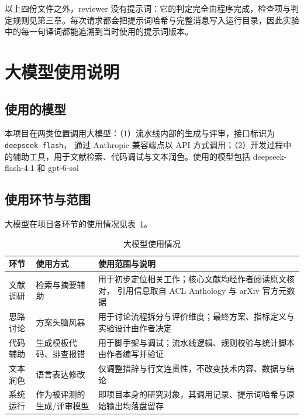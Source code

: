 \documentclass[12pt, a4paper]{ctexart}
\numberwithin{table}{section}
\numberwithin{figure}{section}
\begin{document}
以上四份文件之外，reviewer 没有提示词：它的判定完全由程序完成，检查项与判定规则见第三章。每次请求都会把提示词哈希与完整消息写入运行目录，因此实验中的每一句译词都能追溯到当时使用的提示词版本。

\section{大模型使用说明}

\subsection{使用的模型}
本项目在两类位置调用大模型：（1）流水线内部的生成与评审，接口标识为 \texttt{deepseek-flash}，
通过 Anthropic 兼容端点以 API 方式调用；（2）开发过程中的辅助工具，用于文献检索、代码调试与文本润色。使用的模型包括 deepseek-flash-4.1 和 gpt-6-sol

\subsection{使用环节与范围}
大模型在项目各环节的使用情况见表~\ref{tab:llm}。

\begin{table}[htbp]
  \centering
  \caption{大模型使用情况}
  \label{tab:llm}
  \begin{tabular}{p{}p{}p{}}
    \toprule
    环节 & 使用方式 & 使用范围与说明 \\
    \midrule
    文献调研 & 检索与摘要辅助 & 用于初步定位相关工作；核心文献均经作者阅读原文核对，
                 引用信息取自 ACL Anthology 与 arXiv 官方元数据 \\
    思路讨论 & 方案头脑风暴 & 用于讨论流程拆分与评价维度；最终方案、指标定义与实验设计由作者决定 \\
    代码辅助 & 生成模板代码、排查报错 & 用于脚手架与调试；流水线逻辑、规则校验与统计脚本由作者编写并验证 \\
    文本润色 & 语言表达修改 & 仅调整措辞与行文连贯性，不改变技术内容、数据与结论 \\
    系统运行 & 作为被评测的生成/评审模型 & 即项目本身的研究对象，其调用记录、提示词哈希与原始输出均落盘留存 \\
    \bottomrule
  \end{tabular}
\end{table}
\end{document}
